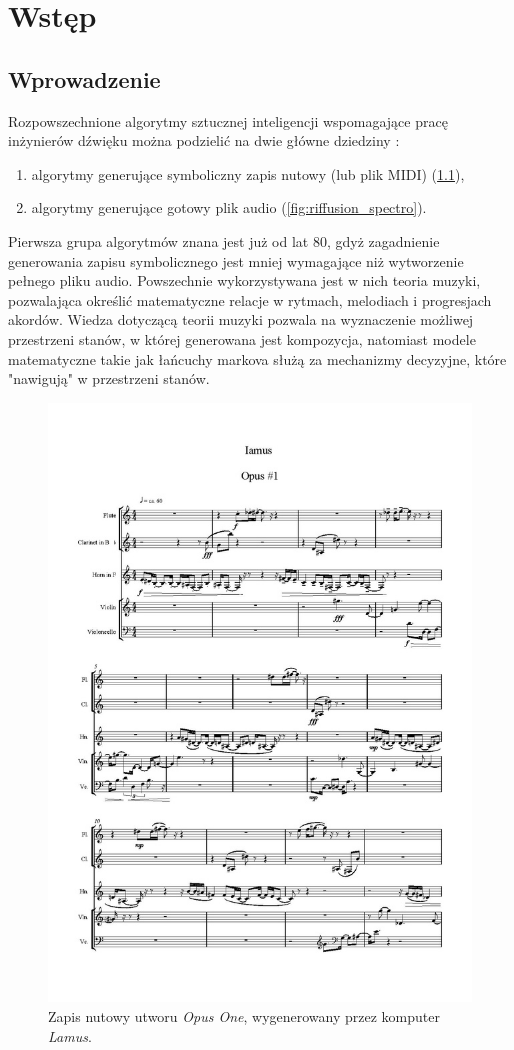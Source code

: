 \chapter{Wstęp}
\section{Wprowadzenie}


Rozpowszechnione algorytmy sztucznej inteligencji wspomagające pracę inżynierów dźwięku można podzielić na dwie główne dziedziny \cite{analysis_generative} \label{traditional_algos}:

\begin{enumerate}
    \item algorytmy generujące symboliczny zapis nutowy (lub plik MIDI) (\ref{fig:lamus_notes}),
    \item algorytmy generujące gotowy plik audio (\ref{fig:riffusion_spectro}).
\end{enumerate}

Pierwsza grupa algorytmów znana jest już od lat 80, gdyż zagadnienie generowania zapisu symbolicznego jest mniej wymagające niż wytworzenie pełnego pliku audio. Powszechnie wykorzystywana jest w nich teoria muzyki, pozwalająca określić matematyczne relacje w rytmach, melodiach i progresjach akordów. Wiedza dotyczącą teorii muzyki pozwala na wyznaczenie możliwej przestrzeni stanów, w której generowana jest kompozycja, natomiast modele matematyczne takie jak łańcuchy markova służą za mechanizmy decyzyjne, które "nawigują" w przestrzeni stanów.

\begin{figure}[H]
    \centering
    \includegraphics[width=0.4\linewidth]{rys01/lamus_notes.jpg}
    \caption{Zapis nutowy utworu \textit{Opus One}, wygenerowany przez komputer \textit{Lamus}.}
    \label{fig:lamus_notes}
\end{figure}


